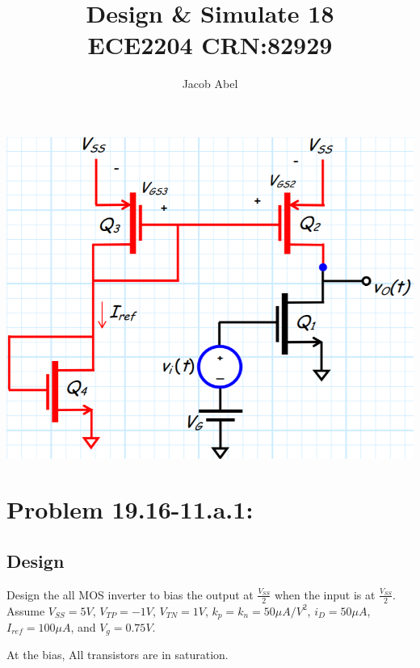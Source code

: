 \documentclass[12pt,letterpaper,titlepage]{article}
\author{Jacob Abel}
\title{	Design \& Simulate 18
	\\\large ECE2204 CRN:82929
}
\begin{document}
\maketitle
\begin{raggedright}
\begin{paracol}{2}
\switchcolumn
\begin{center}
\includegraphics[width=\textwidth, height=14.35\baselineskip, keepaspectratio=true]{ds1}
\end{center}
\switchcolumn
\section{Problem 19.16-11.a.1: } 
\subsection{Design}

Design the all MOS inverter to bias the output at $\frac{V_{SS}}{2}$ when the input is at $\frac{V_{SS}}{2}$. Assume $V_{SS} = 5V$, $V_{TP} = -1V$, $V_{TN} = 1V$, $k_p = k_n = 50\mu A/V^2$, $i_D = 50\mu A$, $I_{ref} = 100\mu A$, and $V_g = 0.75V$.

At the bias, All transistors are in saturation.

\end{paracol}


\end{raggedright}
\end{document}
